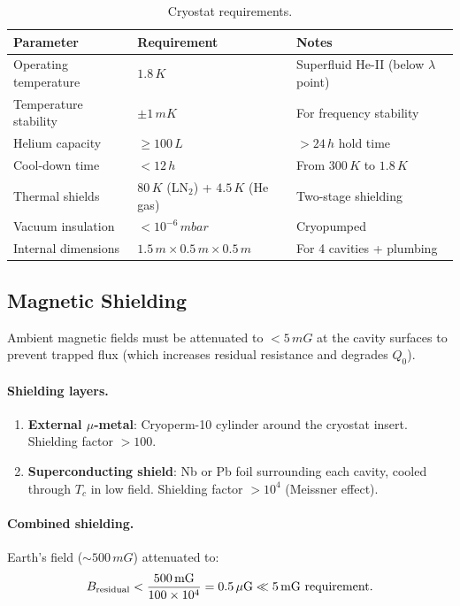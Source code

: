 \documentclass[12pt,a4paper]{article}
\begin{document}
\begin{table}[H]
\centering
\caption{Cryostat requirements.}
\begin{tabular}{lll}
\toprule
\textbf{Parameter} & \textbf{Requirement} & \textbf{Notes} \\
\midrule
Operating temperature & $1.8\,\si{K}$ & Superfluid He-II (below $\lambda$ point) \\
Temperature stability & $\pm 1\,\si{mK}$ & For frequency stability \\
Helium capacity & $\geq 100\,\si{L}$ & $> 24\,\si{h}$ hold time \\
Cool-down time & $< 12\,\si{h}$ & From $300\,\si{K}$ to $1.8\,\si{K}$ \\
Thermal shields & $80\,\si{K}$ (LN$_2$) + $4.5\,\si{K}$ (He gas) & Two-stage shielding \\
Vacuum insulation & $< 10^{-6}\,\si{mbar}$ & Cryopumped \\
Internal dimensions & $1.5\,\si{m} \times 0.5\,\si{m} \times 0.5\,\si{m}$ & For 4 cavities + plumbing \\
\bottomrule
\end{tabular}
\end{table}

\subsection{Magnetic Shielding}

Ambient magnetic fields must be attenuated to $< 5\,\si{mG}$ at the cavity surfaces to prevent trapped flux (which increases residual resistance and degrades $Q_0$).

\paragraph{Shielding layers.}
\begin{enumerate}
\item \textbf{External $\mu$-metal}: Cryoperm-10 cylinder around the cryostat insert. Shielding factor $> 100$.
\item \textbf{Superconducting shield}: Nb or Pb foil surrounding each cavity, cooled through $T_c$ in low field. Shielding factor $> 10^4$ (Meissner effect).
\end{enumerate}

\paragraph{Combined shielding.} Earth's field ($\sim 500\,\si{mG}$) attenuated to:
\begin{equation}
B_{\rm residual} < \frac{500\,\si{mG}}{100 \times 10^4} = 0.5\,\si{\mu G} \ll 5\,\si{mG}\text{ requirement}.
\end{equation}
\end{document}
